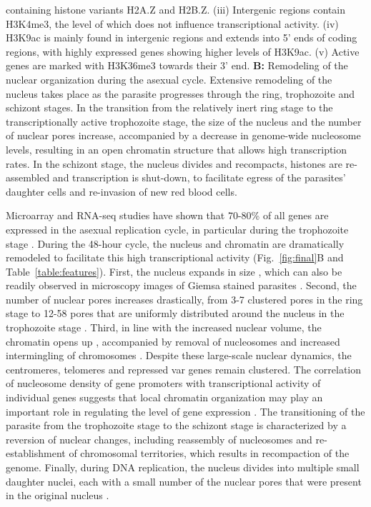 \begin{FPfigure}
{ containing histone variants H2A.Z and H2B.Z. (iii) Intergenic regions contain
 H3K4me3, the level of which does not influence transcriptional activity. (iv)
 H3K9ac is mainly found in intergenic regions and extends into 5’ ends of
 coding regions, with highly expressed genes showing higher levels of H3K9ac.
 (v) Active genes are marked with H3K36me3 towards their 3’ end. \textbf{B:}
 Remodeling
 of the nuclear organization during the asexual cycle. Extensive remodeling of
 the nucleus takes place as the parasite progresses through the ring,
 trophozoite and schizont stages. In the transition from the relatively inert
 ring stage to the transcriptionally active trophozoite stage, the size of the
 nucleus and the number of nuclear pores increase, accompanied by a decrease
 in genome-wide nucleosome levels, resulting in an open chromatin structure
 that allows high transcription rates. In the schizont stage, the nucleus
 divides and recompacts, histones are re-assembled and transcription is
 shut-down, to facilitate egress of the parasites’ daughter cells and
 re-invasion of new red blood cells.}
\label{fig:final}
\end{FPfigure}

Microarray and RNA-seq studies have shown that 70-80\% of all genes are
expressed in the asexual replication cycle, in particular during the
trophozoite stage \citep{bunnik:polysome, leroch:discovery, otto:new}.
During the 48-hour cycle, the nucleus and
chromatin are dramatically remodeled to facilitate this high transcriptional
activity (Fig.~\ref{fig:final}B and Table~\ref{table:features}). First, the nucleus expands in size
\citep{weiner:3d}, which
can also be readily observed in microscopy images of Giemsa stained parasites
\citep{ay:three-dimensional}. Second, the number of nuclear pores increases 
drastically, from 3-7
clustered pores in the ring stage to 12-58 pores that are uniformly
distributed around the nucleus in the trophozoite stage \citep{weiner:3d}.
Third, in line
with the increased nuclear volume, the chromatin opens up
\citep{ay:three-dimensional, weiner:3d}, accompanied
by removal of nucleosomes \citep{bunnik:DNA-encoded, ponts:nucleosome}
 and increased intermingling of chromosomes
\citep{ay:three-dimensional}. Despite these large-scale nuclear dynamics, the centromeres, telomeres
and repressed var genes remain clustered. The correlation of nucleosome
density of gene promoters with transcriptional activity of individual genes
suggests that local chromatin organization may play an important role in
regulating the level of gene expression \citep{bunnik:DNA-encoded}. The transitioning of the
parasite from the trophozoite stage to the schizont stage is characterized by
a reversion of nuclear changes, including reassembly of nucleosomes and
re-establishment of chromosomal territories, which results in recompaction of
the genome. Finally, during DNA replication, the nucleus divides into multiple
small daughter nuclei, each with a small number of the nuclear pores that were
present in the original nucleus \citep{weiner:3d}.

